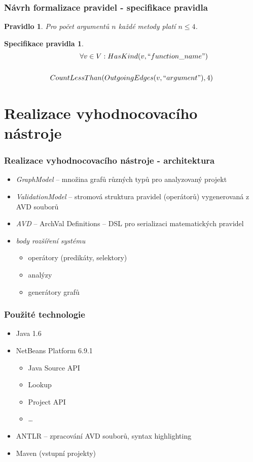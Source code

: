 \documentclass{beamer}
\newtheorem*{rulespec}{Pravidlo}
\newtheorem*{rulemathspec}{Specifikace pravidla}
\begin{document}
\begin{frame}
  \frametitle{Návrh formalizace pravidel - specifikace pravidla}
  \begin{rulespec}
    Pro počet argumentů $n$ každé metody platí $n \leq 4$.
  \end{rulespec}
  \begin{rulemathspec}
    \begin{align*}
      \forall v \in V &: HasKind(v, ``function\_name") \\
      \\
      CountLessThan&(OutgoingEdges(v, ``argument"), 4)
    \end{align*}
  \end{rulemathspec}
\end{frame}

\section{Realizace vyhodnocovacího nástroje}
\begin{frame}
  \frametitle{Realizace vyhodnocovacího nástroje - architektura}
  \begin{itemize}
    \item \emph{GraphModel} -- množina grafů různých typů pro analyzovaný projekt
    \item \emph{ValidationModel} -- stromová struktura pravidel (operátorů) vygenerovaná z AVD souborů
    \item \emph{AVD} -- ArchVal Definitions -- DSL pro serializaci matematických pravidel
    \item \emph{body rozšíření systému}
    \begin{itemize}
      \item operátory (predikáty, selektory)
      \item analýzy
      \item generátory grafů
    \end{itemize}
  \end{itemize}
\end{frame}

\begin{frame}
\frametitle{Použité technologie}
\begin{itemize}
\item Java 1.6
\item NetBeans Platform 6.9.1
\begin{itemize}
\item Java Source API
\item Lookup
\item Project API
\item \ldots
\end{itemize}
\item ANTLR -- zpracování AVD souborů, syntax highlighting
\item Maven (vstupní projekty)
\end{itemize}
\end{frame}
\end{document}
